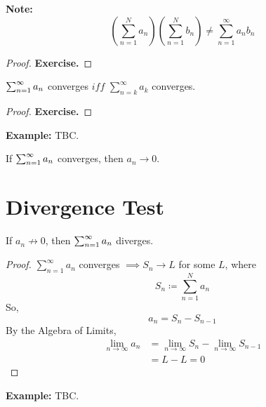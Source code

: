 \documentclass[openany]{report}
\begin{document}
\begin{center}
    \textbf{Note:}
    \[\left(\sum_{n=1}^N a_n\right) \left(\sum_{n=1}^N b_n\right) \neq \sum_{n=1}^\infty a_nb_n\]
\end{center}

\begin{proof}
    \textbf{Exercise.}
\end{proof}

\begin{prop}
    \begin{center}
        $\sum_{n=1}^\infty a_n$ converges $iff$ $\sum_{n=k}^\infty a_k$ converges.
    \end{center}
\end{prop}
\begin{proof}
    \textbf{Exercise.}
\end{proof}

\textbf{Example:} TBC.

\begin{prop}
    If $\sum_{n=1}^\infty a_n$ converges, then $a_n \rightarrow 0$.
\end{prop}




\section{Divergence Test}

\begin{prop}
    If $a_n\not\rightarrow 0$, then $\sum_{n=1}^\infty a_n$ diverges.
\end{prop}
\begin{proof}
    $\sum_{n=1}^\infty a_n$ converges $\implies S_n \rightarrow L$ for some $L$, where 
    \[S_n \coloneqq \sum_{n=1}^N a_n\]
    So, 
    \[a_n = S_n - S_{n-1}\]
    By the Algebra of Limits, 
    \begin{align*}
        \lim_{n\rightarrow \infty} a_n &= \lim_{n\rightarrow \infty} S_n - \lim_{n\rightarrow \infty} S_{n-1}\\
        &= L - L = 0
    \end{align*}
\end{proof}
\textbf{Example:} TBC.
\end{document}

